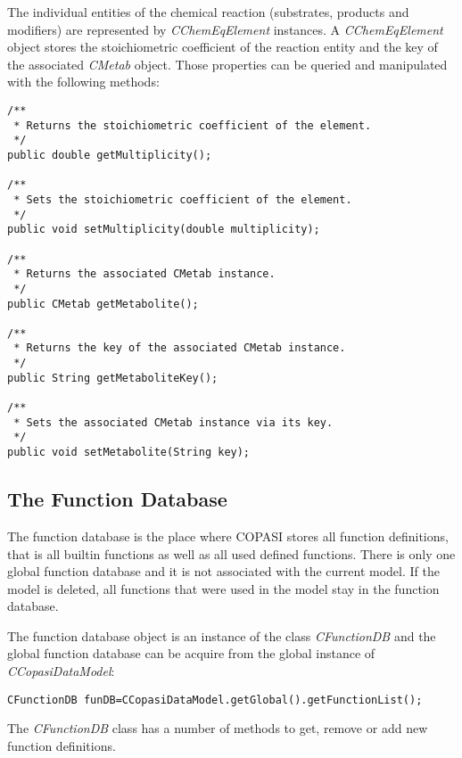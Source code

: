\documentclass[a4,10pt]{article}
\begin{document}
The individual entities of the chemical reaction (substrates, products and modifiers) are
represented by \textit{CChemEqElement} instances. A \textit{CChemEqElement} object stores the stoichiometric coefficient of the reaction entity  and the key of the associated \textit{CMetab} object. Those properties can be queried and manipulated with the following methods:

\begin{lstlisting}
/**
 * Returns the stoichiometric coefficient of the element.
 */
public double getMultiplicity();

/**
 * Sets the stoichiometric coefficient of the element.
 */
public void setMultiplicity(double multiplicity);

/**
 * Returns the associated CMetab instance.
 */
public CMetab getMetabolite();

/**
 * Returns the key of the associated CMetab instance.
 */
public String getMetaboliteKey();

/**
 * Sets the associated CMetab instance via its key.
 */
public void setMetabolite(String key);
\end{lstlisting}

\subsection{The Function Database}
The function database is the place where COPASI stores all function definitions, that is all builtin functions as well as all used defined functions. There is only one global function database and it is not associated with the current model. If the model is deleted, all functions that were used in the model stay in the function database.

The function database object is an instance of the class \textit{CFunctionDB} and the global function database can be acquire from the global instance of \textit{CCopasiDataModel}:

\begin{lstlisting}
CFunctionDB funDB=CCopasiDataModel.getGlobal().getFunctionList();
\end{lstlisting}

The \textit{CFunctionDB} class has a number of methods to get, remove or add new function definitions.
\end{document}
